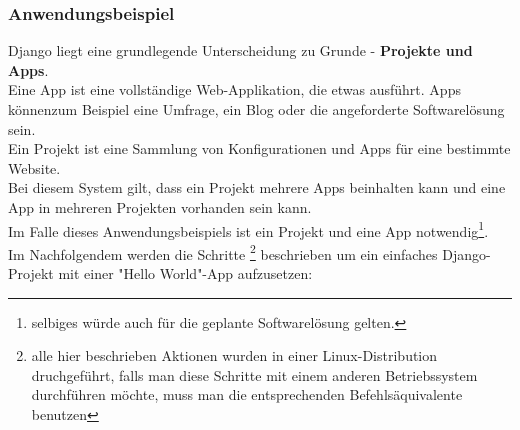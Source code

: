 \documentclass[letterpaper,11pt,leqno]{article}
\begin{document}
\subsubsection{Anwendungsbeispiel}
Django liegt eine grundlegende Unterscheidung zu Grunde - \textbf{Projekte und Apps}.\\Eine App ist eine vollständige
Web-Applikation, die etwas ausführt. Apps könnenzum Beispiel eine Umfrage, ein Blog oder die angeforderte Softwarelösung sein.\\Ein
Projekt ist eine Sammlung von Konfigurationen und Apps für eine bestimmte Website.\\Bei diesem System gilt, dass ein Projekt mehrere
Apps beinhalten kann und eine App in mehreren Projekten vorhanden sein kann.\\Im Falle dieses Anwendungsbeispiels ist ein Projekt
und eine App notwendig\footnote{selbiges würde auch für die geplante Softwarelösung gelten.}.\\Im Nachfolgendem werden die Schritte
\footnote{alle hier beschrieben Aktionen wurden in einer Linux-Distribution druchgeführt, falls man diese Schritte mit einem anderen
Betriebssystem durchführen möchte, muss man die entsprechenden Befehlsäquivalente benutzen} beschrieben um ein einfaches
Django-Projekt mit einer "Hello World"-App aufzusetzen:
\end{document}
